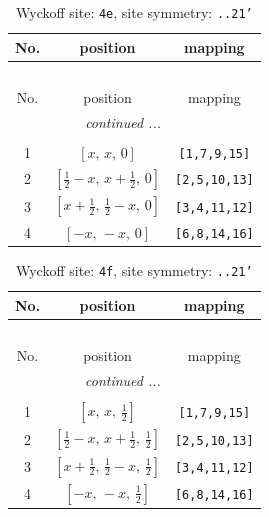 \documentclass[fleqn,8pt]{jsarticle}
\begin{document}
\begin{longtable}{ccc}
\caption{Wyckoff site: {\tt 4e}, site symmetry: {\tt ..21'}}
 \\
 \hline \hline
No. & position & mapping \\ \hline \endfirsthead

\multicolumn{2}{l}{\tablename\ \thetable{}} \\
 \hline \hline
No. & position & mapping \\ \hline \endhead

 \hline \hline
\multicolumn{2}{r}{\footnotesize\it continued ...} \\ \endfoot

 \hline \hline
\multicolumn{2}{r}{} \\ \endlastfoot

1 & $\left[ x,\, x,\, 0 \right]$ & {\tt [1,7,9,15]} \\ \hline
2 & $\left[ \frac{1}{2} - x,\, x + \frac{1}{2},\, 0 \right]$ & {\tt [2,5,10,13]} \\ \hline
3 & $\left[ x + \frac{1}{2},\, \frac{1}{2} - x,\, 0 \right]$ & {\tt [3,4,11,12]} \\ \hline
4 & $\left[ - x,\, - x,\, 0 \right]$ & {\tt [6,8,14,16]} \\
\end{longtable}
\renewcommand{\arraystretch}{1.2}
\begin{longtable}{ccc}
\caption{Wyckoff site: {\tt 4f}, site symmetry: {\tt ..21'}}
 \\
 \hline \hline
No. & position & mapping \\ \hline \endfirsthead

\multicolumn{2}{l}{\tablename\ \thetable{}} \\
 \hline \hline
No. & position & mapping \\ \hline \endhead

 \hline \hline
\multicolumn{2}{r}{\footnotesize\it continued ...} \\ \endfoot

 \hline \hline
\multicolumn{2}{r}{} \\ \endlastfoot

1 & $\left[ x,\, x,\, \frac{1}{2} \right]$ & {\tt [1,7,9,15]} \\ \hline
2 & $\left[ \frac{1}{2} - x,\, x + \frac{1}{2},\, \frac{1}{2} \right]$ & {\tt [2,5,10,13]} \\ \hline
3 & $\left[ x + \frac{1}{2},\, \frac{1}{2} - x,\, \frac{1}{2} \right]$ & {\tt [3,4,11,12]} \\ \hline
4 & $\left[ - x,\, - x,\, \frac{1}{2} \right]$ & {\tt [6,8,14,16]} \\
\end{longtable}
\end{document}
